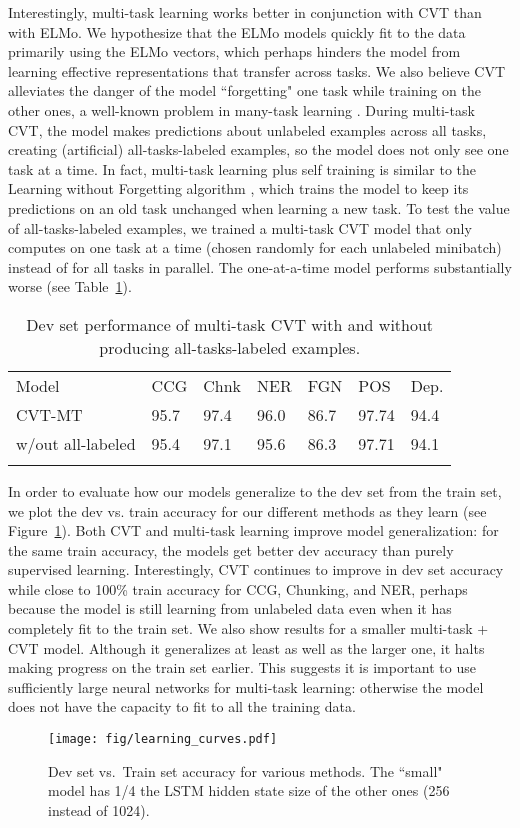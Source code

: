 \documentclass[11pt,a4paper]{article}
\newcommand\Tstrut{\rule{0pt}{2.6ex}}         \newcommand\Bstrut{\rule[-1.0ex]{0pt}{0pt}}   \newcommand{\thinline}{\Xhline{1.0\arrayrulewidth}}
\newcommand{\thickline}{\Xhline{2.5\arrayrulewidth}}
\newcommand{\tsep}	{\Bstrut \\ \thinline}
\newcommand{\ttop}{\thickline}
\newcommand{\tbottom}{\Bstrut \\ \thickline}
\newcommand{\xhdr}[1]{\vspace{1.7mm}\noindent{{\bf #1.}}}
\begin{document}
Interestingly, multi-task learning works better in conjunction with CVT than with ELMo.
We hypothesize that the ELMo models quickly fit to the data primarily using the ELMo vectors, which perhaps hinders the model from learning effective representations that transfer across tasks. 
We also believe CVT alleviates the danger of the model ``forgetting" one task while training on the other ones, a well-known problem in many-task learning \citep{Kirkpatrick2017OvercomingCF}.
During multi-task CVT, the model makes predictions about unlabeled examples across all tasks, creating (artificial) all-tasks-labeled examples, so the model does not only see one task at a time.
In fact, multi-task learning plus self training is similar to the Learning without Forgetting algorithm \citep{Li2016LearningWF}, which trains the model to keep its predictions on an old task unchanged when learning a new task. 
To test the value of all-tasks-labeled examples, we trained a multi-task CVT model that only computes  on one task at a time (chosen randomly for each unlabeled minibatch) instead of for all tasks in parallel. The one-at-a-time model performs substantially worse (see Table~\ref{tab:oaat}).

\addtolength{\tabcolsep}{-3pt}
\begin{table}[h!]
\small
\begin{tabularx}{0.5\textwidth}{X l l l l l l}
\ttop 
Model        & CCG & Chnk & NER & FGN & POS & Dep. \Tstrut \tsep 
CVT-MT & 95.7 & 97.4 & 96.0 & 86.7 & 97.74 & 94.4 \Tstrut \\
\hspace{2mm}w/out all-labeled & 95.4 & 97.1 & 95.6 & 86.3 & 97.71 & 94.1  \tbottom
\end{tabularx}
\caption{Dev set performance of multi-task CVT with and without producing all-tasks-labeled examples.}
\label{tab:oaat}
\end{table}
\addtolength{\tabcolsep}{3pt}

\xhdr{Model Generalization} 
In order to evaluate how our models generalize to the dev set from the train set, we plot the dev vs. train accuracy for our different methods as they learn (see Figure~\ref{fig:curve}). Both CVT and multi-task learning improve model generalization: for the same train accuracy, the models get better dev accuracy than purely supervised learning. 
Interestingly, CVT continues to improve in dev set accuracy while close to 100\% train accuracy for CCG, Chunking, and NER, perhaps because the model is still learning from unlabeled data even when it has completely fit to the train set. We also show results for a smaller multi-task + CVT model. Although it generalizes at least as well as the larger one, it halts making progress on the train set earlier. This suggests it is important to use sufficiently large neural networks for multi-task learning: otherwise the model does not have the capacity to fit to all the training data. 
\begin{figure}[t]
\texttt{[image: fig/learning\_curves.pdf]}
\caption{Dev set vs.\ Train set accuracy for various methods. The ``small" model has 1/4 the LSTM hidden state size of the other ones (256 instead of 1024).}
\label{fig:curve}
\end{figure}
\end{document}
